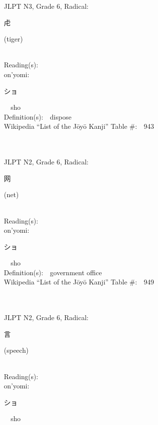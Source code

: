 \begin{multicols}{2}
{JLPT N3, Grade 6, Radical:\ \ {\begin{CJK}{UTF8}{min} 虍 \end{CJK}} (tiger) } \\
Reading(s):\ \ \\
{\hspace*{1em}}on'yomi:\ \ \\
{\hspace*{2em}}{\begin{CJK}{UTF8}{min} ショ \end{CJK}}\ \ sho\ \ \\
Definition(s):\ \ dispose \\
Wikipedia ``List of the J\=oy\=o Kanji'' Table \#:\ \ 943 \\
\ \ \\
{\fontsize{34pt}{40pt}  }\ \ \\  %
{JLPT N2, Grade 6, Radical:\ \ {\begin{CJK}{UTF8}{min} 网 \end{CJK}} (net) } \\
Reading(s):\ \ \\
{\hspace*{1em}}on'yomi:\ \ \\
{\hspace*{2em}}{\begin{CJK}{UTF8}{min} ショ \end{CJK}}\ \ sho\ \ \\
Definition(s):\ \ government office \\
Wikipedia ``List of the J\=oy\=o Kanji'' Table \#:\ \ 949 \\
\ \ \\
{\fontsize{34pt}{40pt}  }\ \ \\  %
{JLPT N2, Grade 6, Radical:\ \ {\begin{CJK}{UTF8}{min} 言 \end{CJK}} (speech) } \\
Reading(s):\ \ \\
{\hspace*{1em}}on'yomi:\ \ \\
{\hspace*{2em}}{\begin{CJK}{UTF8}{min} ショ \end{CJK}}\ \ sho\ \ \\

\end{multicols}
